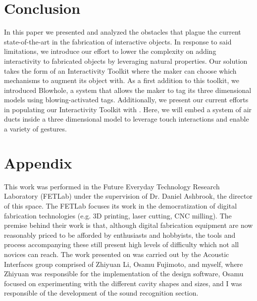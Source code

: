   \section{Conclusion}
    In this paper we presented and analyzed the obstacles that plague the
    current state-of-the-art in the fabrication of interactive objects. In
    response to said limitations, we introduce  our effort to lower the
    complexity on adding interactivity to fabricated objects by leveraging
    natural properties. Our solution takes the form of an Interactivity Toolkit
    where the maker can choose which mechanisms to augment its object with. As
    a first addition to this toolkit, we introduced Blowhole, a system that
    allows the maker to tag its three dimensional models using
    blowing-activated tags. Additionally, we present our current efforts in
    populating our Interactivity Toolkit with \at. Here, we will embed a system
    of air ducts inside a three dimensional model to leverage touch
    interactions and enable a variety of gestures. 

  
  
  
  \newpage
  \section{Appendix}
    This work was performed in the Future Everyday Technology Research
    Laboratory (FETLab) under the supervision of Dr. Daniel Ashbrook, the
    director of this space. The FETLab focuses its work in the democratization
    of digital fabrication technologies (e.g. 3D printing, laser cutting, CNC
    milling). The premise behind their work is that, although digital
    fabrication equipment are now reasonably priced to be afforded by
    enthusiasts and hobbyists, the tools and process accompanying these still
    present high levels of difficulty which not all novices can reach. The work
    presented on \bh was carried out by the Acoustic Interfaces group comprised
    of Zhiyuan Li, Osamu Fujimoto, and myself, where Zhiyuan was responsible
    for the implementation of the design software, Osamu focused on
    experimenting with the different cavity shapes and sizes, and I was
    responsible of the development of the sound recognition section.


